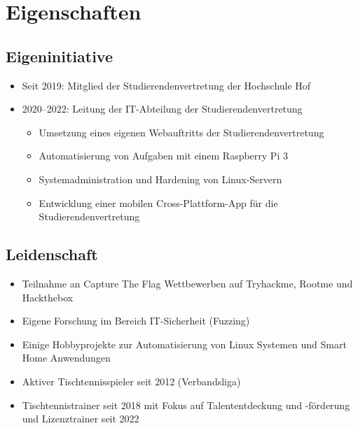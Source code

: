 \section{Eigenschaften}\label{sec:eigenschaften}

\subsection{Eigeninitiative}\label{subsec:eigeninitiative}
\begin{itemize}
    \item Seit 2019: Mitglied der Studierendenvertretung der Hochschule Hof
    \item 2020--2022: Leitung der IT-Abteilung der Studierendenvertretung
    \begin{itemize}
        \item Umsetzung eines eigenen Webauftritts der Studierendenvertretung
        \item Automatisierung von Aufgaben mit einem Raspberry Pi 3
        \item Systemadministration und Hardening von Linux-Servern
        \item Entwicklung einer mobilen Cross-Plattform-App für die Studierendenvertretung
    \end{itemize}
\end{itemize}

\subsection{Leidenschaft}\label{subsec:leidenschaft}
\begin{itemize}
    \item Teilnahme an Capture The Flag Wettbewerben auf Tryhackme, Rootme und Hackthebox
    \item Eigene Forschung im Bereich IT-Sicherheit (Fuzzing)
    \item Einige Hobbyprojekte zur Automatisierung von Linux Systemen und Smart Home Anwendungen
    \item Aktiver Tischtennisspieler seit 2012 (Verbandsliga)
    \item Tischtennistrainer seit 2018 mit Fokus auf Talententdeckung und -förderung und Lizenztrainer seit 2022
\end{itemize}
